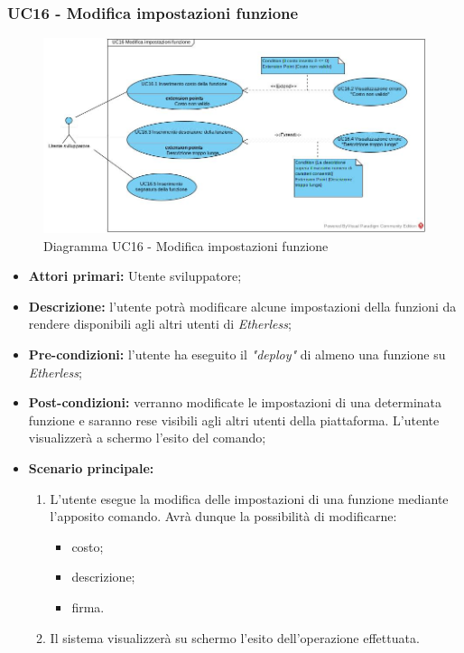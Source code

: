 \subsubsection{UC16 - Modifica impostazioni funzione}
\begin{figure}[h]
	\centering
	\includegraphics[width=\linewidth]{res/img/UC16.jpg}
	\caption{Diagramma UC16 - Modifica impostazioni funzione}
\end{figure}
\begin{itemize}
	\item \textbf{Attori primari:} Utente sviluppatore;
	\item \textbf{Descrizione:} l'utente potrà modificare alcune impostazioni della funzioni da rendere disponibili agli altri utenti di \textit{Etherless};
	\item \textbf{Pre-condizioni:} l'utente ha eseguito il \textit{"deploy\glos"} di almeno una funzione su \textit{Etherless};
	\item \textbf{Post-condizioni:} verranno modificate le impostazioni di una determinata funzione e saranno rese visibili agli altri utenti della piattaforma. L'utente visualizzerà a schermo l'esito del comando;
	\item \textbf{Scenario principale:}
	\begin{enumerate}
		\item L'utente esegue la modifica delle impostazioni di una funzione mediante l'apposito comando. Avrà dunque la possibilità di modificarne:
		\begin{itemize}
			\item costo;
			\item descrizione;
			\item firma.
		\end{itemize}
		\item Il sistema visualizzerà su schermo l'esito dell'operazione effettuata.
	\end{enumerate}
\end{itemize}
